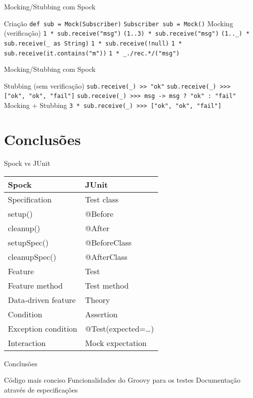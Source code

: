 \documentclass{beamer}
\begin{document}
\begin{frame}{Mocking/Stubbing com Spock}
 \begin{outline}
    Criação
    \2 \texttt{def sub = Mock(Subscriber)}
    \2 \texttt{Subscriber sub = Mock()}
    Mocking (verificação)
     \texttt{1 * sub.receive("msg")}
     \texttt{(1..3) * sub.receive("msg")}
     \texttt{(1.._) * sub.receive(_ as String)}
     \texttt{1 * sub.receive(!null)}
     \texttt{1 * sub.receive({it.contains("m")})}
     \texttt{1 * _./rec.*/("msg")}
 \end{outline}
\end{frame}

\begin{frame}{Mocking/Stubbing com Spock}
 \begin{outline}
    Stubbing (sem verificação)
     \texttt{sub.receive(_) >> "ok"}
     \texttt{sub.receive(_) >>> ["ok", "ok", "fail"]}
     \texttt{sub.receive(_) >>> {msg -> msg ? "ok" : "fail"}}
    Mocking + Stubbing
     \texttt{3 * sub.receive(_) >>> ["ok", "ok", "fail"]}
 \end{outline}
\end{frame}

\section{Conclusões}

\begin{frame}{Spock vs JUnit}
  \begin{table}[]
    \begin{tabular}{@{}ll@{}}
      \toprule
      Spock               & JUnit              \\ \midrule
      Specification       & Test class         \\
      setup()             & @Before            \\
      cleanup()           & @After             \\
      setupSpec()         & @BeforeClass       \\
      cleanupSpec()       & @AfterClass        \\
      Feature             & Test               \\
      Feature method      & Test method        \\
      Data-driven feature & Theory             \\
      Condition           & Assertion          \\
      Exception condition & @Test(expected=…​)  \\
      Interaction         & Mock expectation   \\ \bottomrule
    \end{tabular}
  \end{table}
\end{frame}

\begin{frame}{Conclusões}
 \begin{outline}
    Código mais conciso
    Funcionalidades do Groovy para os testes
    Documentação através de especificações
 \end{outline}
\end{frame}
\end{document}
